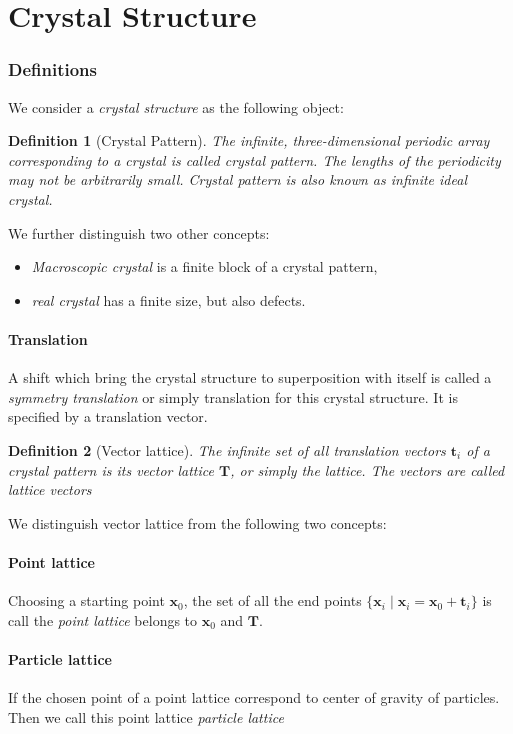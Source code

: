 \documentclass{amsart}
\newcommand{\bfx}{\mathbf{x}}
\newcommand{\bft}{\mathbf{t}}
\newtheorem{definition}{Definition}
\begin{document}
\part{Crystal Structure}
\section*{Definitions}
We consider a \emph{crystal structure} as the following object:
\begin{definition}
    [Crystal Pattern]
    The infinite, three-dimensional periodic array corresponding to a crystal is called \emph{crystal pattern}.
    The lengths of the periodicity may not be arbitrarily small. Crystal pattern is also known 
    as \emph{infinite ideal crystal}.
\end{definition}
We further distinguish two other concepts:
\begin{itemize}
    \item \emph{Macroscopic crystal} is a finite block of a crystal pattern,
    \item \emph{real crystal} has a finite size, but also defects.
\end{itemize}

\subsection*{Translation}
A shift which bring the crystal structure to superposition with itself is called 
a \emph{symmetry translation} or simply translation for this crystal structure. 
It is specified by a translation vector.

\vspace{10pt}

\begin{definition}
    [Vector lattice]
    The infinite set of all translation vectors $\bft_i$ of a crystal pattern is its \emph{vector lattice} $\mathbf{T}$, 
    or simply the \emph{lattice}. 
    The vectors are called \emph{lattice vectors}
\end{definition}
We distinguish vector lattice from the following two concepts:

\subsection*{Point lattice}
Choosing a starting point $\bfx_0$, the set of all the end points $\{\bfx_i\mid\bfx_i = \bfx_0 + \bft_i\}$
is call the \emph{point lattice} belongs to $\bfx_0$ and $\mathbf{T}$.
\subsection*{Particle lattice}
If the chosen point of a point lattice correspond to center of gravity of particles. Then we call this point lattice \emph{particle lattice}
\end{document}
